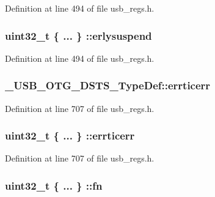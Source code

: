 Definition at line 494 of file usb\-\_\-regs.\-h.

\hypertarget{group___u_s_b___o_t_g___d_r_i_v_e_r_gaf77736608685b5747143e728307af3e1}{
\subsubsection[{erlysuspend}]{\setlength{\rightskip}{0pt plus 5cm}uint32\-\_\-t \{ ... \} \-::erlysuspend}}\label{group___u_s_b___o_t_g___d_r_i_v_e_r_gaf77736608685b5747143e728307af3e1}


Definition at line 494 of file usb\-\_\-regs.\-h.

\hypertarget{group___u_s_b___o_t_g___d_r_i_v_e_r_ga1b4282c2381173d21b6fea82cb38f5b0}{
\subsubsection[{errticerr}]{ \-\_\-\-U\-S\-B\-\_\-\-O\-T\-G\-\_\-\-D\-S\-T\-S\-\_\-\-Type\-Def\-::errticerr}}\label{group___u_s_b___o_t_g___d_r_i_v_e_r_ga1b4282c2381173d21b6fea82cb38f5b0}


Definition at line 707 of file usb\-\_\-regs.\-h.

\hypertarget{group___u_s_b___o_t_g___d_r_i_v_e_r_gaecb74c61f9f65ab6df1b1d8938e607d2}{
\subsubsection[{errticerr}]{\setlength{\rightskip}{0pt plus 5cm}uint32\-\_\-t \{ ... \} \-::errticerr}}\label{group___u_s_b___o_t_g___d_r_i_v_e_r_gaecb74c61f9f65ab6df1b1d8938e607d2}


Definition at line 707 of file usb\-\_\-regs.\-h.

\hypertarget{group___u_s_b___o_t_g___d_r_i_v_e_r_gabcb3a0ac9e058bd3d7430eb41a9c349d}{
\subsubsection[{fn}]{\setlength{\rightskip}{0pt plus 5cm}uint32\-\_\-t \{ ... \} \-::fn}}\label{group___u_s_b___o_t_g___d_r_i_v_e_r_gabcb3a0ac9e058bd3d7430eb41a9c349d}


